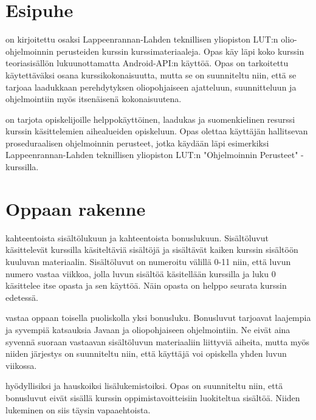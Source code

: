 \documentclass{tufte-book}
\newcommand{\lutin}{Lappeenrannan-Lahden teknillisen yliopiston LUT:n }
\begin{document}

\section{Esipuhe}
\label{esipuhe}

 on kirjoitettu osaksi \lutin olio-ohjelmoinnin perusteiden kurssin
kurssimateriaaleja. Opas käy läpi koko kurssin  teoriasisällön lukuunottamatta Android-API:n
käyttöä. Opas on tarkoitettu käytettäväksi osana kurssikokonaisuutta, mutta se on suunniteltu
niin, että se tarjoaa laadukkaan perehdytyksen oliopohjaiseen ajatteluun, suunnitteluun ja
ohjelmointiin myös itsenäisenä kokonaisuutena.

 on tarjota opiskelijoille helppokäyttöinen,
laadukas ja suomenkielinen resurssi kurssin käsittelemien aihealueiden
opiskeluun. Opas olettaa käyttäjän hallitsevan proseduraalisen ohjelmoinnin
perusteet, jotka käydään läpi esimerkiksi \lutin "Ohjelmoinnin Perusteet" 
-kurssilla.


\section{Oppaan rakenne}
\label{rakenteesta}

 kahteentoista sisältölukuun ja kahteentoista bonuslukuun. Sisältöluvut
käsittelevät kurssilla käsiteltäviä sisältöjä ja sisältävät kaiken kurssin sisältöön kuuluvan
materiaalin. Sisältöluvut on numeroitu välillä 0-11 niin, että luvun numero vastaa viikkoa, jolla
luvun sisältöä käsitellään kurssilla ja luku 0 käsittelee itse opasta ja sen käyttöä. Näin opasta
on helppo seurata kurssin edetessä.

 vastaa oppaan toisella puoliskolla yksi bonusluku. Bonusluvut
tarjoavat laajempia ja syvempiä katsauksia Javaan ja oliopohjaiseen ohjelmointiin. Ne eivät aina
syvennä suoraan vastaavan sisältöluvun materiaaliin liittyviä aiheita, mutta myös niiden järjestys
on suunniteltu niin, että käyttäjä voi opiskella yhden luvun viikossa.

 hyödyllisiksi ja hauskoiksi lisälukemistoiksi. Opas on
suunniteltu niin, että bonusluvut eivät sisällä kurssin oppimistavoitteisiin luokiteltua sisältöä.
Niiden lukeminen on siis täysin vapaaehtoista.
\end{document}
